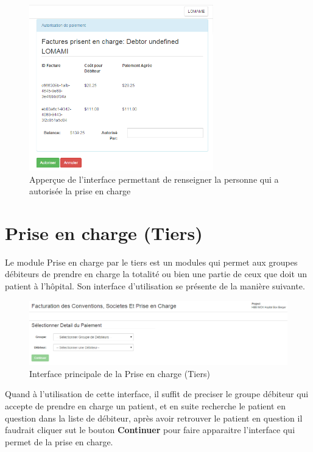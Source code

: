 \documentclass[12pt,a4paper]{report}
\begin{document}
\begin{figure}[h]
\begin{center}
\includegraphics[width=8cm]{pic/AutPrCharge.png}
\end{center}
\caption{Apperçue de l'interface permettant de renseigner la personne qui a autorisée la prise en charge}
\label{Apperçue de l'interface permettant de renseigner la personne qui a autorisée la prise en charge}
\end{figure}


\newpage
\section{ Prise en charge (Tiers)}
Le module  Prise en charge par le tiers est un modules qui permet aux groupes débiteurs de prendre en charge la totalité ou bien une partie de ceux que doit un patient à l'hôpital. Son interface d'utilisation se présente de la manière suivante.

\begin{figure}[h]
\begin{center}
\includegraphics[width=14cm]{pic/FacturationConv.png}
\end{center}
\caption{Interface principale de la Prise en charge (Tiers)}
\label{Interface principale de la Prise en charge (Tiers)}
\end{figure}

Quand à l'utilisation de cette interface, il suffit de preciser le groupe débiteur qui accepte de prendre en charge un patient, et en suite recherche le patient en question dans la liste de débiteur, après avoir retrouver le patient en question il faudrait cliquer sut le bouton  \textbf{Continuer} pour faire apparaitre l'interface qui permet de la prise en charge.
\end{document}
